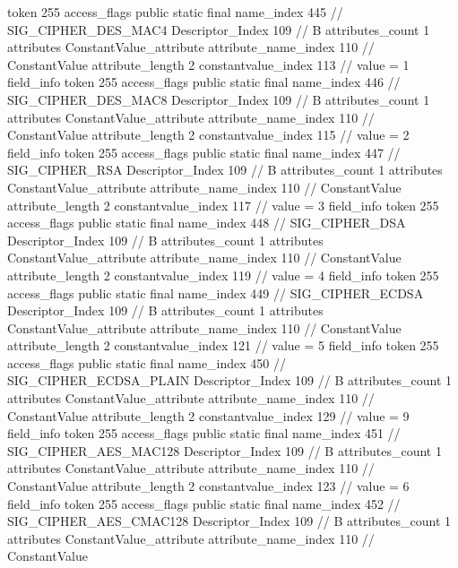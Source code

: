 {{{{{				token	255
				access_flags	public static final
				name_index	445		// SIG_CIPHER_DES_MAC4
				Descriptor_Index	109		// B
				attributes_count	1
				attributes {
				ConstantValue_attribute {
					attribute_name_index	110		// ConstantValue
					attribute_length	2
					constantvalue_index	113		// value = 1
				}
				}
			}
			field_info {
				token	255
				access_flags	public static final
				name_index	446		// SIG_CIPHER_DES_MAC8
				Descriptor_Index	109		// B
				attributes_count	1
				attributes {
				ConstantValue_attribute {
					attribute_name_index	110		// ConstantValue
					attribute_length	2
					constantvalue_index	115		// value = 2
				}
				}
			}
			field_info {
				token	255
				access_flags	public static final
				name_index	447		// SIG_CIPHER_RSA
				Descriptor_Index	109		// B
				attributes_count	1
				attributes {
				ConstantValue_attribute {
					attribute_name_index	110		// ConstantValue
					attribute_length	2
					constantvalue_index	117		// value = 3
				}
				}
			}
			field_info {
				token	255
				access_flags	public static final
				name_index	448		// SIG_CIPHER_DSA
				Descriptor_Index	109		// B
				attributes_count	1
				attributes {
				ConstantValue_attribute {
					attribute_name_index	110		// ConstantValue
					attribute_length	2
					constantvalue_index	119		// value = 4
				}
				}
			}
			field_info {
				token	255
				access_flags	public static final
				name_index	449		// SIG_CIPHER_ECDSA
				Descriptor_Index	109		// B
				attributes_count	1
				attributes {
				ConstantValue_attribute {
					attribute_name_index	110		// ConstantValue
					attribute_length	2
					constantvalue_index	121		// value = 5
				}
				}
			}
			field_info {
				token	255
				access_flags	public static final
				name_index	450		// SIG_CIPHER_ECDSA_PLAIN
				Descriptor_Index	109		// B
				attributes_count	1
				attributes {
				ConstantValue_attribute {
					attribute_name_index	110		// ConstantValue
					attribute_length	2
					constantvalue_index	129		// value = 9
				}
				}
			}
			field_info {
				token	255
				access_flags	public static final
				name_index	451		// SIG_CIPHER_AES_MAC128
				Descriptor_Index	109		// B
				attributes_count	1
				attributes {
				ConstantValue_attribute {
					attribute_name_index	110		// ConstantValue
					attribute_length	2
					constantvalue_index	123		// value = 6
				}
				}
			}
			field_info {
				token	255
				access_flags	public static final
				name_index	452		// SIG_CIPHER_AES_CMAC128
				Descriptor_Index	109		// B
				attributes_count	1
				attributes {
				ConstantValue_attribute {
					attribute_name_index	110		// ConstantValue
}}}}}}}
